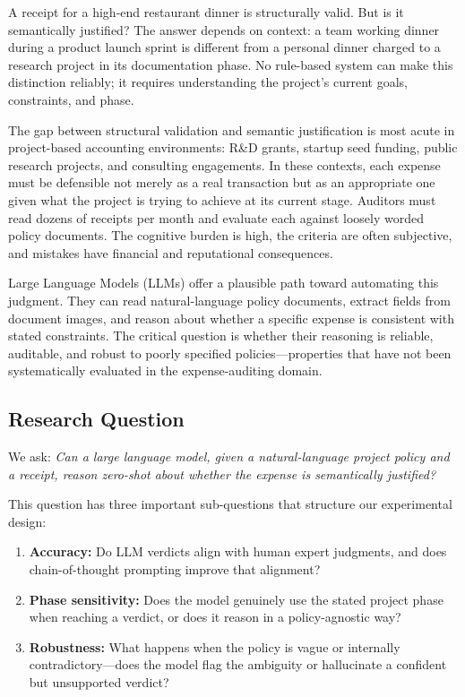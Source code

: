 \documentclass[11pt,a4paper]{article}
\begin{document}
A receipt for a high-end restaurant dinner is structurally valid. But is it semantically justified? The answer depends on context: a team working dinner during a product launch sprint is different from a personal dinner charged to a research project in its documentation phase. No rule-based system can make this distinction reliably; it requires understanding the project's current goals, constraints, and phase.

The gap between structural validation and semantic justification is most acute in project-based accounting environments: R\&D grants, startup seed funding, public research projects, and consulting engagements. In these contexts, each expense must be defensible not merely as a real transaction but as an appropriate one given what the project is trying to achieve at its current stage. Auditors must read dozens of receipts per month and evaluate each against loosely worded policy documents. The cognitive burden is high, the criteria are often subjective, and mistakes have financial and reputational consequences.

Large Language Models (LLMs) offer a plausible path toward automating this judgment. They can read natural-language policy documents, extract fields from document images, and reason about whether a specific expense is consistent with stated constraints. The critical question is whether their reasoning is reliable, auditable, and robust to poorly specified policies---properties that have not been systematically evaluated in the expense-auditing domain.

\subsection{Research Question}
We ask: \textit{Can a large language model, given a natural-language project policy and a receipt, reason zero-shot about whether the expense is semantically justified?}

This question has three important sub-questions that structure our experimental design:
\begin{enumerate}
    \item \textbf{Accuracy:} Do LLM verdicts align with human expert judgments, and does chain-of-thought prompting improve that alignment?
    \item \textbf{Phase sensitivity:} Does the model genuinely use the stated project phase when reaching a verdict, or does it reason in a policy-agnostic way?
    \item \textbf{Robustness:} What happens when the policy is vague or internally contradictory---does the model flag the ambiguity or hallucinate a confident but unsupported verdict?
\end{enumerate}
\end{document}
